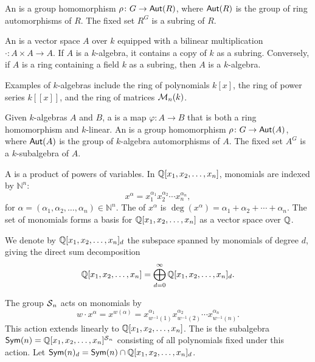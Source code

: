 An  is a group homomorphism \(\rho \colon G \to \operatorname{\mathsf{Aut}}(R)\), where \(\operatorname{\mathsf{Aut}}(R)\) is the group of ring automorphisms of \(R\). The fixed set \(R^G\) is a subring of \(R\).

An  is a vector space \(A\) over \(k\) equipped with a bilinear multiplication \(\cdot \colon A \times A \to A\). If \(A\) is a \(k\)-algebra, it contains a copy of \(k\) as a subring. Conversely, if \(A\) is a ring containing a field \(k\) as a subring, then \(A\) is a \(k\)-algebra.

Examples of \(k\)-algebras include the ring of polynomials \(k[x]\), the ring of power series \(k[[x]]\), and the ring of matrices \(\operatorname{\mathcal{M}}_n(k)\).

Given \(k\)-algebras \(A\) and \(B\), a  is a map \(\varphi \colon A \to B\) that is both a ring homomorphism and \(k\)-linear. An  is a group homomorphism \(\rho \colon G \to \operatorname{\mathsf{Aut}}(A)\), where \(\operatorname{\mathsf{Aut}}(A)\) is the group of \(k\)-algebra automorphisms of \(A\). The fixed set \(A^G\) is a \(k\)-subalgebra of \(A\).

A  is a product of powers of variables. In \(\mathbb{Q}[x_1, x_2, \ldots, x_n]\), monomials are indexed by \(\mathbb{N}^n\):
\[
    x^\alpha = x_1^{\alpha_1}x_2^{\alpha_2}\cdots x_n^{\alpha_n},
\]
for \(\alpha = (\alpha_1, \alpha_2, \ldots, \alpha_n) \in \mathbb{N}^n\). The  of \(x^\alpha\) is \(\deg(x^\alpha) = \alpha_1 + \alpha_2 + \cdots + \alpha_n\). The set of monomials forms a basis for \(\mathbb{Q}[x_1, x_2, \ldots, x_n]\) as a vector space over \(\mathbb{Q}\).

We denote by \(\mathbb{Q}[x_1, x_2, \ldots, x_n]_d\) the subspace spanned by monomials of degree \(d\), giving the direct sum decomposition
\[
    \mathbb{Q}[x_1, x_2, \ldots, x_n] = \bigoplus_{d=0}^\infty \mathbb{Q}[x_1, x_2, \ldots, x_n]_d.
\]

The group \(\operatorname{\mathcal{S}}_n\) acts on monomials by
\[
    w \cdot x^\alpha = x^{w(\alpha)} = x_{w^{-1}(1)}^{\alpha_1}x_{w^{-1}(2)}^{\alpha_2}\cdots x_{w^{-1}(n)}^{\alpha_n}.
\]
This action extends linearly to \(\mathbb{Q}[x_1, x_2, \ldots, x_n]\).
The  is the subalgebra \(\operatorname{\mathsf{Sym}}(n) = \mathbb{Q}[x_1, x_2, \ldots, x_n]^{\operatorname{\mathcal{S}}_n}\) consisting of all polynomials fixed under this action.
Let \(\operatorname{\mathsf{Sym}}(n)_d = \operatorname{\mathsf{Sym}}(n) \cap \mathbb{Q}[x_1, x_2, \ldots, x_n]_d\).

